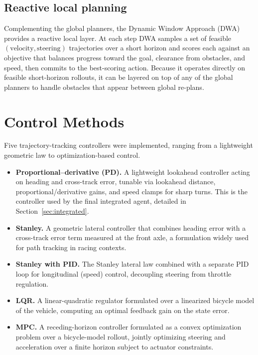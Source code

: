 \documentclass[conference]{IEEEtran}
\begin{document}
\subsection{Reactive local planning}

Complementing the global planners, the Dynamic Window Approach (DWA) provides a
reactive local layer. At each step DWA samples a set of feasible
$(\text{velocity}, \text{steering})$ trajectories over a short horizon and
scores each against an objective that balances progress toward the goal,
clearance from obstacles, and speed, then commits to the best-scoring action.
Because it operates directly on feasible short-horizon rollouts, it can be
layered on top of any of the global planners to handle obstacles that appear
between global re-plans.

\section{Control Methods}

Five trajectory-tracking controllers were implemented, ranging from a
lightweight geometric law to optimization-based control.

\begin{itemize}
  \item \textbf{Proportional--derivative (PD).} A lightweight lookahead
  controller acting on heading and cross-track error, tunable via lookahead
  distance, proportional/derivative gains, and speed clamps for sharp turns.
  This is the controller used by the final integrated agent, detailed in
  Section~\ref{sec:integrated}.
  \item \textbf{Stanley.} A geometric lateral controller that combines heading
  error with a cross-track error term measured at the front axle, a formulation
  widely used for path tracking in racing contexts.
  \item \textbf{Stanley with PID.} The Stanley lateral law combined with a
  separate PID loop for longitudinal (speed) control, decoupling steering from
  throttle regulation.
  \item \textbf{LQR.} A linear-quadratic regulator formulated over a linearized
  bicycle model of the vehicle, computing an optimal feedback gain on the state
  error.
  \item \textbf{MPC.} A receding-horizon controller formulated as a convex
  optimization problem over a bicycle-model rollout, jointly optimizing steering
  and acceleration over a finite horizon subject to actuator constraints.
\end{itemize}
\end{document}
